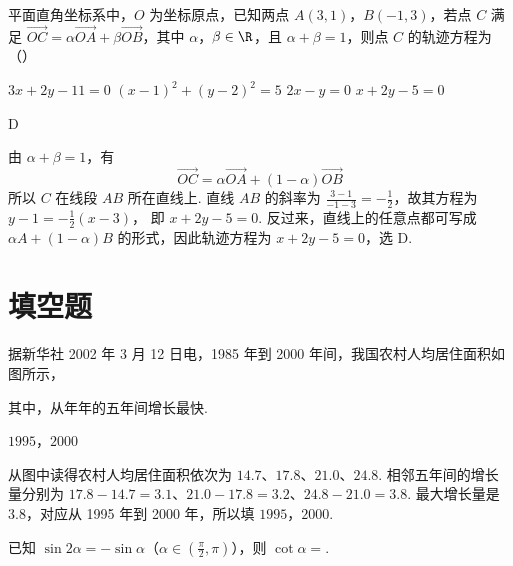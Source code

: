 \begin{problem}
平面直角坐标系中，\(O\) 为坐标原点，已知两点 \(A(3,1)\)，\(B(-1,3)\)，若点 \(C\) 满足 \(\overrightarrow{OC} = \alpha \overrightarrow{OA} + \beta \overrightarrow{OB}\)，其中 \(\alpha\)，\(\beta \in \R\)，且 \(\alpha + \beta = 1\)，则点 \(C\) 的轨迹方程为（\quad）

\choices
    {\( 3x + 2y - 11 = 0 \)}
    {\((x - 1)^{2} + (y - 2)^{2} = 5\)}
    {\(2x - y = 0\)}
    {\(x + 2y - 5 = 0\)}
\end{problem}

\begin{answer}
D
\end{answer}

\begin{solution}
由 \(\alpha+\beta=1\)，有
\[
\overrightarrow{OC}=\alpha\overrightarrow{OA}+(1-\alpha)\overrightarrow{OB}
\]
所以 \(C\) 在线段 \(AB\) 所在直线上. 直线 \(AB\) 的斜率为 \(\frac{3-1}{-1-3}=-\frac12\)，故其方程为
\(y-1=-\frac12(x-3)\)，
即 \(x+2y-5=0\). 反过来，直线上的任意点都可写成 \(\alpha A+(1-\alpha)B\) 的形式，因此轨迹方程为 \(x+2y-5=0\)，选 D.
\end{solution}

\section{填空题}
\begin{problem}
据新华社 2002 年 3 月 12 日电，1985 年到 2000 年间，我国农村人均居住面积如图所示，

其中，从\fillinblank{}年\fillinblank{}年的五年间增长最快.

\end{problem}

\begin{answer}
\(1995\)，\(2000\)
\end{answer}

\begin{solution}
从图中读得农村人均居住面积依次为 \(14.7\)、\(17.8\)、\(21.0\)、\(24.8\). 相邻五年间的增长量分别为 \(17.8-14.7=3.1\)、\(21.0-17.8=3.2\)、\(24.8-21.0=3.8\). 最大增长量是 \(3.8\)，对应从 1995 年到 2000 年，所以填 \(1995\)，\(2000\).
\end{solution}

\begin{problem}
已知 \(\sin 2\alpha = -\sin \alpha\)（\(\alpha \in \left(\frac{\pi}{2}, \pi\right)\)），则 \(\cot \alpha =\)\fillinblank{}.
\end{problem}

